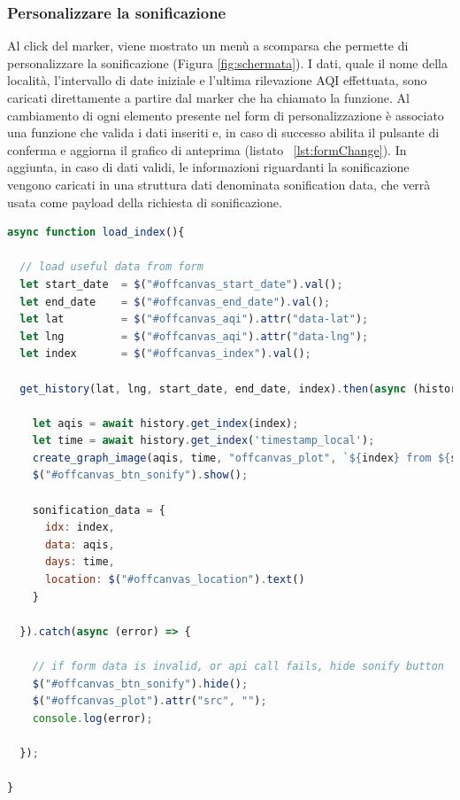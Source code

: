 \subsubsection{Personalizzare la sonificazione}
Al click del marker, viene mostrato un menù a scomparsa che permette di personalizzare la sonificazione (Figura \ref{fig:schermata}).
I dati, quale il nome della località, l'intervallo di date iniziale e l'ultima rilevazione AQI effettuata, sono caricati direttamente a partire dal marker che ha chiamato la funzione.
Al cambiamento di ogni elemento presente nel form di personalizzazione è associato una funzione che valida i dati inseriti e, in caso di successo abilita il pulsante di conferma e aggiorna il grafico di anteprima (listato ~\ref{lst:formChange}).
In aggiunta, in caso di dati validi, le informazioni riguardanti la sonificazione vengono caricati in una struttura dati denominata sonification data, che verrà usata come payload della richiesta di sonificazione.

\begin{lstlisting}[language=Javascript,caption={La funzione che gestisce il cambiamento di un elemento del form.},label={lst:formChange}]
async function load_index(){

  // load useful data from form
  let start_date  = $("#offcanvas_start_date").val();
  let end_date    = $("#offcanvas_end_date").val();
  let lat         = $("#offcanvas_aqi").attr("data-lat");
  let lng         = $("#offcanvas_aqi").attr("data-lng");
  let index       = $("#offcanvas_index").val();
  
  get_history(lat, lng, start_date, end_date, index).then(async (history) => {

    let aqis = await history.get_index(index);
    let time = await history.get_index('timestamp_local');
    create_graph_image(aqis, time, "offcanvas_plot", `${index} from ${start_date} to ${end_date}`);
    $("#offcanvas_btn_sonify").show();

    sonification_data = {
      idx: index,
      data: aqis,
      days: time,
      location: $("#offcanvas_location").text()
    }

  }).catch(async (error) => {
      
    // if form data is invalid, or api call fails, hide sonify button
    $("#offcanvas_btn_sonify").hide();
    $("#offcanvas_plot").attr("src", "");
    console.log(error);

  });

}
\end{lstlisting}

